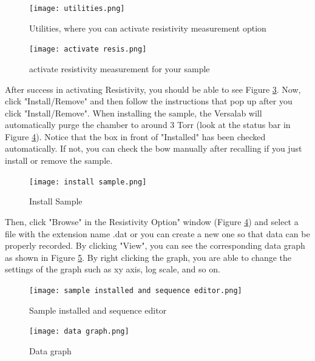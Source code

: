 \documentclass{article}
\begin{document}
        \begin{figure}[H]
            \centering
            \texttt{[image: utilities.png]}
            \caption{Utilities, where you can activate resistivity measurement option}
            \label{utilities}
        \end{figure}

        \begin{figure}[H]
            \centering
            \texttt{[image: activate resis.png]}
            \caption{activate resistivity measurement for your sample}
            \label{activate}
        \end{figure}

        After success in activating Resistivity, you should be able to see Figure \ref{install sample}. Now, click "Install/Remove" and then follow the instructions that pop up after you click "Install/Remove". When installing the sample, the Versalab will automatically purge the chamber to around 3 Torr (look at the status bar in Figure \ref{Sample installed and sequence editor}). Notice that the box in front of "Installed" has been checked automatically. If not, you can check the bow manually after recalling if you just install or remove the sample.
        
        \begin{figure}[H]
            \centering
            \texttt{[image: install sample.png]}
            \caption{Install Sample}
            \label{install sample}
        \end{figure}

        Then, click "Browse" in the Resistivity Option" window (Figure \ref{Sample installed and sequence editor}) and select a file with the extension name .dat or you can create a new one so that data can be properly recorded. By clicking "View", you can see the corresponding data graph as shown in Figure \ref{Data graph}. By right clicking the graph, you are able to change the settings of the graph such as xy axis, log scale, and so on.
        
        \begin{figure}[H]
            \centering
            \texttt{[image: sample installed and sequence editor.png]}
            \caption{Sample installed and sequence editor}
            \label{Sample installed and sequence editor}
        \end{figure}

        \begin{figure}[H]
            \centering
            \texttt{[image: data graph.png]}
            \caption{Data graph}
            \label{Data graph}
        \end{figure}
\end{document}
